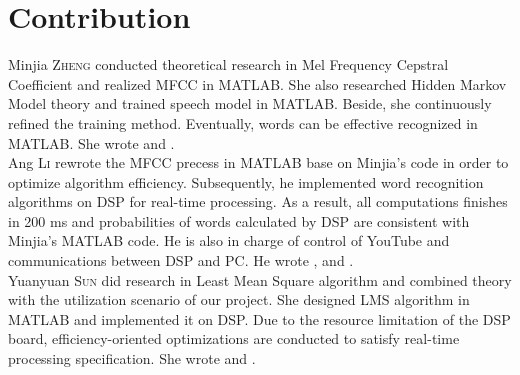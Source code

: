 \chapter*{Contribution}

Minjia \textsc{Zheng} conducted theoretical research in Mel Frequency Cepstral Coefficient and realized MFCC in MATLAB. She also researched Hidden Markov Model theory and trained speech model in MATLAB. Beside, she continuously refined the training method. Eventually, words can be effective recognized in MATLAB. She wrote  and .\\

Ang \textsc{Li} rewrote the MFCC precess in MATLAB base on Minjia's code in order to optimize algorithm efficiency. Subsequently, he implemented word recognition algorithms on DSP for real-time processing. As a result, all computations finishes in 200 ms and probabilities of words calculated by DSP are consistent with Minjia's MATLAB code. He is also in charge of control of YouTube and communications between DSP and PC. He wrote ,  and .\\

Yuanyuan \textsc{Sun} did research in Least Mean Square algorithm and combined theory with the utilization scenario of our project. She designed LMS algorithm in MATLAB and implemented it on DSP. Due to the resource limitation of the DSP board, efficiency-oriented optimizations are conducted to satisfy real-time processing specification. She wrote  and .
